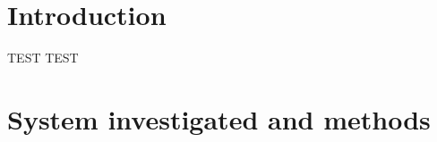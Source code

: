 \documentclass{article}
\begin{document}
\clearpage
\section{Introduction}
\label{Intro}

TEST TEST




\section{System investigated and methods}


\clearpage
\appendix







\end{document}
